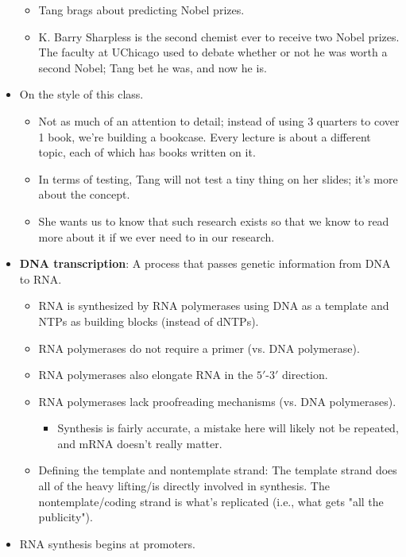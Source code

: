 \documentclass[../notes.tex]{subfiles}
\begin{document}
\begin{itemize}
\begin{itemize}
        \item Tang brags about predicting Nobel prizes.
        \item K. Barry Sharpless is the second chemist ever to receive two Nobel prizes. The faculty at UChicago used to debate whether or not he was worth a second Nobel; Tang bet he was, and now he is.
    \end{itemize}
    \item On the style of this class.
    \begin{itemize}
        \item Not as much of an attention to detail; instead of using 3 quarters to cover 1 book, we're building a bookcase. Every lecture is about a different topic, each of which has books written on it.
        \item In terms of testing, Tang will not test a tiny thing on her slides; it's more about the concept.
        \item She wants us to know that such research exists so that we know to read more about it if we ever need to in our research.
    \end{itemize}
    \item \textbf{DNA transcription}: A process that passes genetic information from DNA to RNA.
    \begin{itemize}
        \item RNA is synthesized by RNA polymerases using DNA as a template and NTPs as building blocks (instead of dNTPs).
        \item RNA polymerases do not require a primer (vs. DNA polymerase).
        \item RNA polymerases also elongate RNA in the $5'$-$3'$ direction.
        \item RNA polymerases lack proofreading mechanisms (vs. DNA polymerases).
        \begin{itemize}
            \item Synthesis is fairly accurate, a mistake here will likely not be repeated, and mRNA doesn't really matter.
        \end{itemize}
        \item Defining the template and nontemplate strand: The template strand does all of the heavy lifting/is directly involved in synthesis. The nontemplate/coding strand is what's replicated (i.e., what gets "all the publicity").
    \end{itemize}
    \item RNA synthesis begins at promoters.
    \begin{itemize}

\end{itemize}
\end{itemize}
\end{document}
